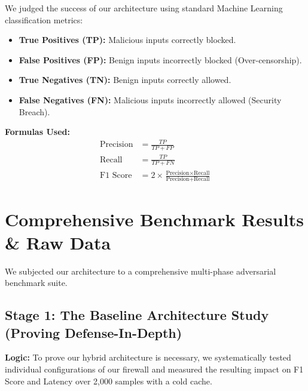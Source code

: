 \documentclass[12pt,a4paper]{article}
\begin{document}
We judged the success of our architecture using standard Machine Learning classification metrics:
\begin{itemize}
    \item \textbf{True Positives (TP):} Malicious inputs correctly blocked.
    \item \textbf{False Positives (FP):} Benign inputs incorrectly blocked (Over-censorship).
    \item \textbf{True Negatives (TN):} Benign inputs correctly allowed.
    \item \textbf{False Negatives (FN):} Malicious inputs incorrectly allowed (Security Breach).
\end{itemize}

\textbf{Formulas Used:}
\begin{align}
\text{Precision} &= \frac{TP}{TP + FP} \\[0.5em]
\text{Recall} &= \frac{TP}{TP + FN} \\[0.5em]
\text{F1 Score} &= 2 \times \frac{\text{Precision} \times \text{Recall}}{\text{Precision} + \text{Recall}}
\end{align}

\section{Comprehensive Benchmark Results \& Raw Data}

We subjected our architecture to a comprehensive multi-phase adversarial benchmark suite.

\subsection{Stage 1: The Baseline Architecture Study (Proving Defense-In-Depth)}

\textbf{Logic:} To prove our hybrid architecture is necessary, we systematically tested individual configurations of our firewall and measured the resulting impact on F1 Score and Latency over 2,000 samples with a cold cache.
\end{document}
